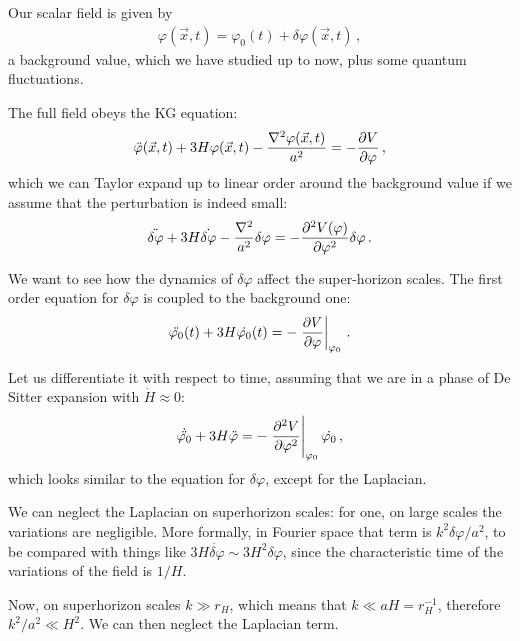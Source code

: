 \documentclass[main.tex]{subfiles}
\begin{document}

Our scalar field is given by 
%
\begin{align}
\varphi (\vec{x}, t) = \varphi_0 (t) + \delta \varphi (\vec{x}, t)
\,,
\end{align}
%
a background value, which we have studied up to now, plus some quantum fluctuations. 

The full field obeys the KG equation: 
%
\begin{align}
\ddot{\varphi}(\vec{x}, t) + 3 H \varphi (\vec{x}, t)
- \frac{\nabla^2 \varphi (\vec{x}, t)}{a^2} 
= - \pdv{V}{\varphi }
\,,
\end{align}
%
which we can Taylor expand up to linear order around the background value if we assume that the perturbation is indeed small: 
%
\begin{align}
\ddot{ \delta \varphi} + 3 H \dot{\delta \varphi}
- \frac{\nabla^2}{a^2} \delta \varphi 
= - \pdv[2]{V(\varphi )}{\varphi } \delta \varphi 
\,.
\end{align}

We want to see how the dynamics of \(\delta \varphi \) affect the super-horizon scales. 
The first order equation for \(\delta \varphi \) is coupled to the background one: 
%
\begin{align}
\ddot{\varphi_0} (t) + 3 H \dot{\varphi_0 } (t) = - \eval{\pdv{V}{\varphi }}_{\varphi_0 }
\,.
\end{align}

Let us differentiate it with respect to time, assuming that we are in a phase of De Sitter expansion with \(\dot{H} \approx 0 \): 
%
\begin{align}
\dot{\ddot{\varphi_0}} + 3 H \ddot{\varphi} 
= - \eval{\pdv[2]{V}{\varphi }}_{\varphi_0 } \dot{\varphi_0 }
\,,
\end{align}
%
which looks similar to the equation for \(\delta \varphi \), except for the Laplacian. 

We can neglect the Laplacian on superhorizon scales: for one, on large scales the variations are negligible. More formally, in Fourier space that term is \(k^2 \delta \varphi / a^2\), to be compared with things like \(3 H \dot{ \delta  \varphi} \sim 3 H^2 \delta \varphi \), since the characteristic time of the variations of the field is \(1/H\).  

Now, on superhorizon scales \(k \gg r_H\), which means that \(k \ll aH = r_H^{-1}\), therefore \(k^2 / a^2 \ll H^2\). 
We can then neglect the Laplacian term. 
\end{document}
